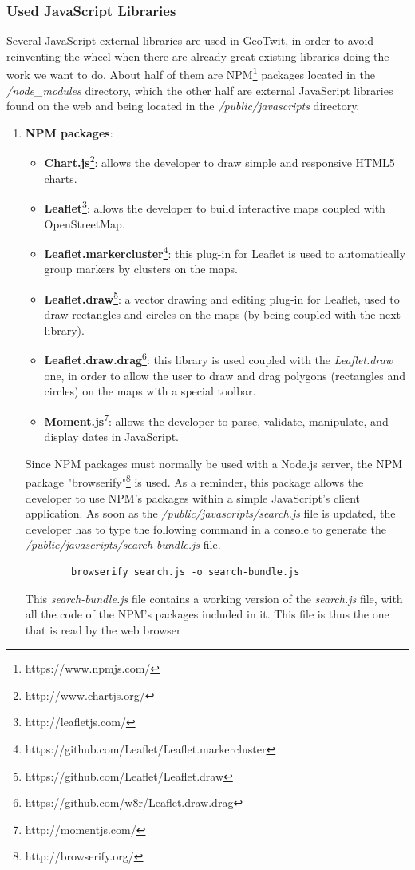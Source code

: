 \documentclass[a4paper,11pt]{report}
\begin{document}
\subsubsection{Used JavaScript Libraries}
\label{usedJavascriptLibraries}
Several JavaScript external libraries are used in GeoTwit, in order to avoid reinventing the wheel when there are already great existing libraries doing the work we want to do. About half of them are NPM\footnote{https://www.npmjs.com/} packages located in the \emph{/node\_modules} directory, which the other half are external JavaScript libraries found on the web and being located in the \emph{/public/javascripts} directory.
\begin{enumerate}
	\item \textbf{NPM packages}:
	\begin{itemize}
		\item \textbf{Chart.js}\footnote{http://www.chartjs.org/}: allows the developer to draw simple and responsive HTML5 charts.
		\item \textbf{Leaflet}\footnote{http://leafletjs.com/}: allows the developer to build interactive maps coupled with OpenStreetMap.
		\item \textbf{Leaflet.markercluster}\footnote{https://github.com/Leaflet/Leaflet.markercluster}: this plug-in for Leaflet is used to automatically group markers by clusters on the maps.
		\item \textbf{Leaflet.draw}\footnote{https://github.com/Leaflet/Leaflet.draw}: a vector drawing and editing plug-in for Leaflet, used to draw rectangles and circles on the maps (by being coupled with the next library).
		\item \textbf{Leaflet.draw.drag}\footnote{https://github.com/w8r/Leaflet.draw.drag}: this library is used coupled with the \emph{Leaflet.draw} one, in order to allow the user to draw and drag polygons (rectangles and circles) on the maps with a special toolbar.
		\item \textbf{Moment.js}\footnote{http://momentjs.com/}: allows the developer to parse, validate, manipulate, and display dates in JavaScript.
	\end{itemize}
	\newpage
	
	Since NPM packages must normally be used with a Node.js server, the NPM package "browserify"\footnote{http://browserify.org/} is used. As a reminder, this package allows the developer to use NPM's packages within a simple JavaScript's client application.  As soon as the \emph{/public/javascripts/search.js} file is updated, the developer has to type the following command in a console to generate the \emph{/public/javascripts/search-bundle.js} file.
	\begin{lstlisting}
		browserify search.js -o search-bundle.js
	\end{lstlisting}
	This \emph{search-bundle.js} file contains a working version of the \emph{search.js} file, with all the code of the NPM's packages included in it. This file is thus the one that is read by the web browser
	

\end{enumerate}
\end{document}
